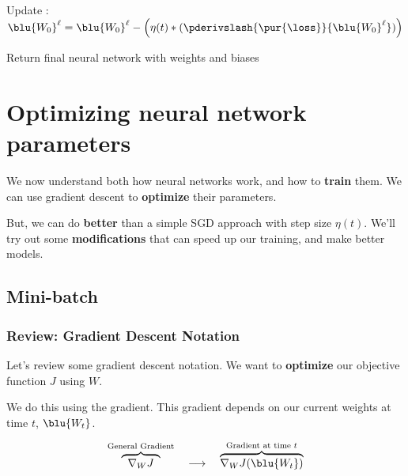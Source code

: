 \begin{codebox}
                                        \li Update :
                                        \Do
                                            \li $\blu{W_0}^{\ell} = \blu{W_0}^{\ell} - 
                                            \Big( \eta(t) * (\pderivslash{ \pur{\loss} }{ \blu{W_0}^{\ell} }) \Big)$
                                        \End
                                        
                                        \li
                                        
                                    \End
                            \End
                        \End

                \End
            \li Return final neural network with weights and biases
    
        \end{codebox}
\pagebreak

\section{Optimizing neural network parameters}

    We now understand both how neural networks work, and how to \textbf{train} them. We can use gradient descent to \textbf{optimize} their parameters.
    
    But, we can do \textbf{better} than a simple SGD approach with step size $\eta(t)$. We'll try out some \textbf{modifications} that can speed up our training, and make better models.

    \subsection{Mini-batch}
    
        \subsubsection{Review: Gradient Descent Notation}
        
            Let's review some gradient descent notation. We want to \textbf{optimize} our objective function $J$ using $W$.
            
            We do this using the gradient. This gradient depends on our current weights at time $t$, $\blu{W_{t}}$.
            
            \begin{equation}
                \overbrace{
                    \;\;
                    \nabla_W J
                    \;\;
                }^{\text{General Gradient}}
                \quad
                \longrightarrow
                \quad
                \overbrace{
                    \nabla_W J ( \blu{ W_{t} } )
                }^{\text{Gradient at time $t$}}
            \end{equation}
            
